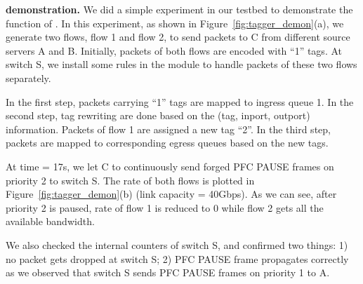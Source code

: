  \textbf{\sysname{} demonstration.}  We did a simple experiment in our testbed to demonstrate the function of \sysname{}. In this experiment, as shown in Figure~\ref{fig:tagger_demon}(a), we generate two flows, flow 1 and flow 2, to send packets to C from different source servers A and B. Initially, packets of both flows are encoded with ``1'' tags. At switch S, we install some rules in the \sysname{} module to handle packets of these two flows separately. 
 
 In the first step, packets carrying ``1'' tags are mapped to ingress queue 1. In the second step, tag rewriting are done based on the (tag, inport, outport) information. Packets of flow 1 are assigned a new tag ``2''. In the third step, packets are mapped to corresponding egress queues based on the new tags.
 
At time = 17s, we let C to continuously send forged PFC PAUSE frames on priority 2 to switch S. The rate of both flows is plotted in Figure~\ref{fig:tagger_demon}(b) (link capacity = 40Gbps). As we can see,  after priority 2 is paused, rate of flow 1 is reduced to 0 while flow 2 gets all the available bandwidth. 

We also checked the internal counters of switch S, and confirmed two things: 1) no packet gets dropped at switch S; 2) PFC PAUSE  frame propagates correctly as we observed that switch S sends PFC PAUSE frames on priority 1 to A.
%
%
%
%
%
%

